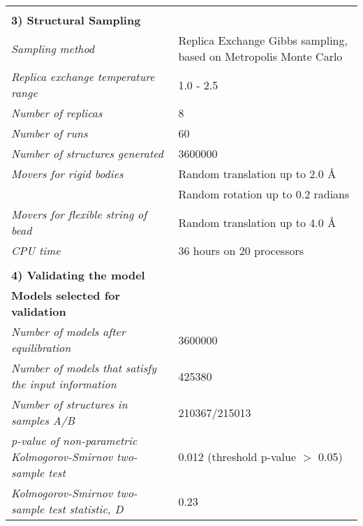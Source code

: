\documentclass[8pt,a4paper]{article}
\begin{document}
\begin{longtable}{ p{} | p{} }
   &  \\
    \normalsize{\textbf{3) Structural Sampling}} & \\
    \hline
            \textit{Sampling method} & Replica Exchange Gibbs sampling, based on Metropolis Monte Carlo\\
                \textit{Replica exchange temperature range} & 1.0 - 2.5\\
                \textit{Number of replicas} & 8\\
                \textit{Number of runs} & 60\\
                \textit{Number of structures generated} & 3600000\\
                \textit{Movers for rigid bodies} & Random translation up to 2.0 \AA\\
            & Random rotation up to 0.2
 radians \\
                \textit{Movers for flexible string of bead} & Random translation up to 4.0 \AA\\
                \textit{CPU time} & 36 hours on 20 processors\\
        
   &  \\
  \normalsize{\textbf{4) Validating the model}} & \\
    \hline
   \textbf{Models selected for validation} & \\
    \hline
          \textit{Number of models after equilibration} & 3600000\\
                \textit{Number of models that satisfy the input information} & 425380\\
                \textit{Number of structures in samples A/B} & 210367/215013\\
                \textit{p-value of non-parametric Kolmogorov-Smirnov two-sample test} & 0.012 (threshold p-value $>$ 0.05)\\
                \textit{Kolmogorov-Smirnov two-sample test statistic, D} & 0.23\\
           \hline
    

\end{longtable}
\end{document}
